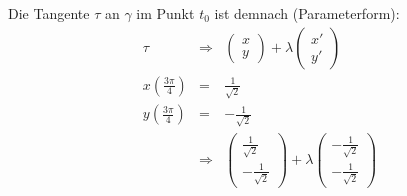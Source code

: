 Die Tangente $\tau$ an $\gamma$ im Punkt $t_0$ ist demnach (Parameterform):
\begin{eqnarray*}
  \tau &\Rightarrow& \left(\begin{array}{c} x \\ y \end{array}\right) + \lambda  \left(\begin{array}{c} x' \\ y' \end{array}\right)\\
	x\left( \frac{3\pi}{4}\right) &=& \frac{1}{\sqrt{2}}\\
	y\left( \frac{3\pi}{4}\right) &=& -\frac{1}{\sqrt{2}}\\
	&\Rightarrow& \left(\begin{array}{c} \frac{1}{\sqrt{2}} \\ -\frac{1}{\sqrt{2}} \end{array}\right) + \lambda  \left(\begin{array}{c} -\frac{1}{\sqrt{2}} \\ -\frac{1}{\sqrt{2}} \end{array}\right)\\
\end{eqnarray*}    


